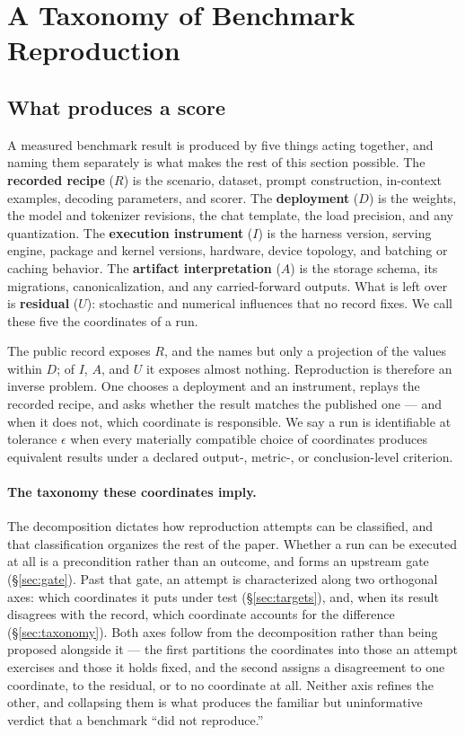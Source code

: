 \section{A Taxonomy of Benchmark Reproduction}
\label{sec:model}

\subsection{What produces a score}

A measured benchmark result is produced by five things acting together, and naming them separately is what makes the rest of this section possible. The \textbf{recorded recipe} ($R$) is the scenario, dataset, prompt construction, in-context examples, decoding parameters, and scorer. The \textbf{deployment} ($D$) is the weights, the model and tokenizer revisions, the chat template, the load precision, and any quantization. The \textbf{execution instrument} ($I$) is the harness version, serving engine, package and kernel versions, hardware, device topology, and batching or caching behavior. The \textbf{artifact interpretation} ($A$) is the storage schema, its migrations, canonicalization, and any carried-forward outputs. What is left over is \textbf{residual} ($U$): stochastic and numerical influences that no record fixes. We call these five the coordinates of a run.

The public \helm record exposes $R$, and the names but only a projection of the values within $D$; of $I$, $A$, and $U$ it exposes almost nothing. Reproduction is therefore an inverse problem. One chooses a deployment and an instrument, replays the recorded recipe, and asks whether the result matches the published one --- and when it does not, which coordinate is responsible. We say a run is identifiable at tolerance $\epsilon$ when every materially compatible choice of coordinates produces equivalent results under a declared output-, metric-, or conclusion-level criterion.

\paragraph{The taxonomy these coordinates imply.} The decomposition dictates how reproduction attempts can be classified, and that classification organizes the rest of the paper. Whether a run can be executed at all is a precondition rather than an outcome, and forms an upstream gate (\S\ref{sec:gate}). Past that gate, an attempt is characterized along two orthogonal axes: which coordinates it puts under test (\S\ref{sec:targets}), and, when its result disagrees with the record, which coordinate accounts for the difference (\S\ref{sec:taxonomy}). Both axes follow from the decomposition rather than being proposed alongside it --- the first partitions the coordinates into those an attempt exercises and those it holds fixed, and the second assigns a disagreement to one coordinate, to the residual, or to no coordinate at all. Neither axis refines the other, and collapsing them is what produces the familiar but uninformative verdict that a benchmark ``did not reproduce.''

